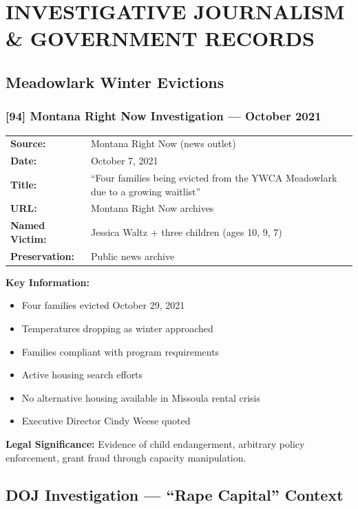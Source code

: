 \documentclass[11pt,letterpaper]{article}
\newcommand{\citeref}[1]{\textbf{\color{NavyBlue}[#1]}}
\begin{document}
\section{INVESTIGATIVE JOURNALISM \& GOVERNMENT RECORDS}

\subsection{Meadowlark Winter Evictions}

\subsubsection{\citeref{94} Montana Right Now Investigation --- October 2021}

\begin{tabular}{@{}p{1.4in}p{4.6in}@{}}
\textbf{Source:} & Montana Right Now (news outlet)\\
\textbf{Date:} & October 7, 2021\\
\textbf{Title:} & ``Four families being evicted from the YWCA Meadowlark due to a growing waitlist''\\
\textbf{URL:} & Montana Right Now archives\\
\textbf{Named Victim:} & Jessica Waltz + three children (ages 10, 9, 7)\\
\textbf{Preservation:} & Public news archive\\
\end{tabular}

\vspace{0.1in}

\textbf{Key Information:}
\begin{itemize}[leftmargin=*]
\item Four families evicted October 29, 2021
\item Temperatures dropping as winter approached
\item Families compliant with program requirements
\item Active housing search efforts
\item No alternative housing available in Missoula rental crisis
\item Executive Director Cindy Weese quoted
\end{itemize}

\textbf{Legal Significance:} Evidence of child endangerment, arbitrary policy enforcement, grant fraud through capacity manipulation.

\subsection{DOJ Investigation --- ``Rape Capital'' Context}
\end{document}

